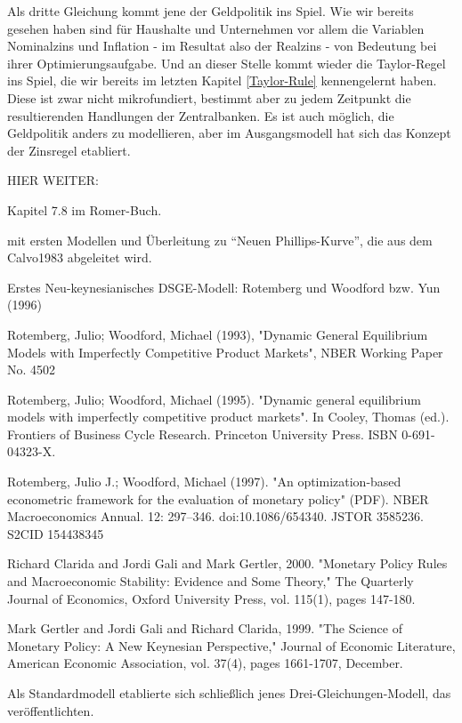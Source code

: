 Als dritte Gleichung kommt jene der Geldpolitik ins Spiel. Wie wir bereits gesehen haben sind für Haushalte und Unternehmen vor allem die Variablen Nominalzins und Inflation - im Resultat also der Realzins -  von Bedeutung bei ihrer Optimierungsaufgabe. Und an dieser Stelle kommt wieder die Taylor-Regel\parencite{Taylor1993} ins Spiel, die wir bereits im letzten Kapitel \ref{Taylor-Rule} kennengelernt haben. Diese ist zwar nicht mikrofundiert, bestimmt aber zu jedem Zeitpunkt die resultierenden Handlungen der Zentralbanken. Es ist auch möglich, die Geldpolitik anders zu modellieren, aber im Ausgangsmodell hat sich das Konzept der Zinsregel etabliert. 


HIER WEITER:

Kapitel 7.8 im Romer-Buch.


mit ersten Modellen und Überleitung zu "`Neuen Phillips-Kurve"', die aus dem Calvo1983 abgeleitet wird.

Erstes Neu-keynesianisches DSGE-Modell: Rotemberg und Woodford bzw. Yun (1996)

Rotemberg, Julio; Woodford, Michael (1993), "Dynamic General Equilibrium Models with Imperfectly Competitive Product Markets", NBER Working Paper No. 4502

Rotemberg, Julio; Woodford, Michael (1995). "Dynamic general equilibrium models with imperfectly competitive product markets". In Cooley, Thomas (ed.). Frontiers of Business Cycle Research. Princeton University Press. ISBN 0-691-04323-X.

Rotemberg, Julio J.; Woodford, Michael (1997). "An optimization-based econometric framework for the evaluation of monetary policy" (PDF). NBER Macroeconomics Annual. 12: 297–346. doi:10.1086/654340. JSTOR 3585236. S2CID 154438345


Richard Clarida and Jordi Gali and Mark Gertler, 2000. "Monetary Policy Rules and Macroeconomic Stability: Evidence and Some Theory," The Quarterly Journal of Economics, Oxford University Press, vol. 115(1), pages 147-180.

Mark Gertler and Jordi Gali and Richard Clarida, 1999. "The Science of Monetary Policy: A New Keynesian Perspective," Journal of Economic Literature, American Economic Association, vol. 37(4), pages 1661-1707, December.





Als Standardmodell etablierte sich schließlich jenes Drei-Gleichungen-Modell, das \textcite{Gali2000} veröffentlichten\parencite[S. 311]{Romer2019}.

